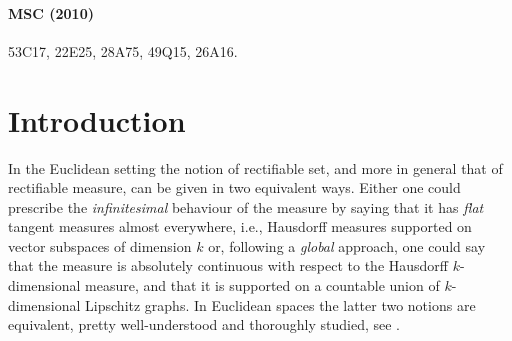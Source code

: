 \documentclass[10pt, a4paper,
oneside, headinclude,footinclude]{scrartcl}
\begin{document}
\paragraph*{MSC (2010)} 53C17, 22E25, 28A75, 49Q15, 26A16.







\section{Introduction}


In the Euclidean setting the notion of rectifiable set, and more in general that of rectifiable measure, can be given in two equivalent ways. Either one could prescribe the \textit{infinitesimal} behaviour of the measure by saying that it has \textit{flat} tangent measures almost everywhere, i.e., Hausdorff measures supported on vector subspaces of dimension $k$ or, following a \textit{global} approach, one could say that the measure is absolutely continuous with respect to the Hausdorff $k$-dimensional measure, and that it is supported on a countable union of $k$-dimensional Lipschitz graphs. In Euclidean spaces the latter two notions are equivalent, pretty well-understood and  thoroughly studied, see \cite{Federer1996GeometricTheory, Preiss1987GeometryDensities, Mattila1995GeometrySpaces, DeLellis2008RectifiableMeasures}. 
\end{document}
